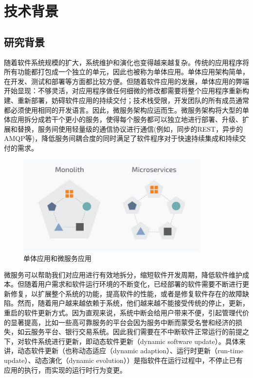 \documentclass[12pt,a4paper]{article}
\theoremstyle{definition}
\begin{document}




\newpage
\section{技术背景}\label{Background}

\subsection{研究背景}
随着软件系统规模的扩大，系统维护和演化也变得越来越复杂。传统的应用程序将所有功能都打包成一个独立的单元，因此也被称为单体应用。单体应用架构简单，在开发、测试和部署等方面都比较方便。但随着软件应用的发展，单体应用的弊端开始显现：不够灵活，对应用程序做任何细微的修改都需要将整个应用程序重新构建、重新部署，妨碍软件应用的持续交付；技术栈受限，开发团队的所有成员通常都必须使用相同的开发语言。因此，微服务架构应运而生。微服务架构将大型的单体应用拆分成若干个更小的服务，使得每个服务都可以独立地进行部署、升级、扩展和替换，服务间使用轻量级的通信协议进行通信(例如，同步的REST，异步的AMQP等)，降低服务间耦合度的同时满足了软件程序对于快速持续集成和持续交付的需求。
\begin{figure}[ht]
 \centering
 \includegraphics[height=5cm]{images/Microservices-vs-Monolith.jpg}
 \caption{单体应用和微服务应用}
 \label{fig:Microservices-vs-Monolith}
\end{figure}

微服务可以帮助我们对应用进行有效地拆分，缩短软件开发周期，降低软件维护成本。但随着用户需求和软件运行环境的不断变化，已经部署的软件需要不断进行更新修复，以扩展整个系统的功能，提高软件的性能，或者是修复软件存在的故障缺陷。然而，随着用户越来越依赖于系统，他们越来越不能接受传统的停止，更新，重启的软件更新方式。因为直观来说，系统中断会给用户带来不便，引起管理代价的显著提高，比如一些高可靠服务的平台会因为服务中断而蒙受名誉和经济的损失，如云服务平台、银行交易系统。因此我们需要在不中断软件正常运行的前提之下，对软件系统进行更新，即动态软件更新（dynamic software update）。具体来讲，动态软件更新（也称动态适应（dynamic adaption）、运行时更新（run-time update）、动态演化（dynamic evolution））是指软件在运行过程中，不停止已有应用的执行，而实现的运行时行为变更。
\end{document}
